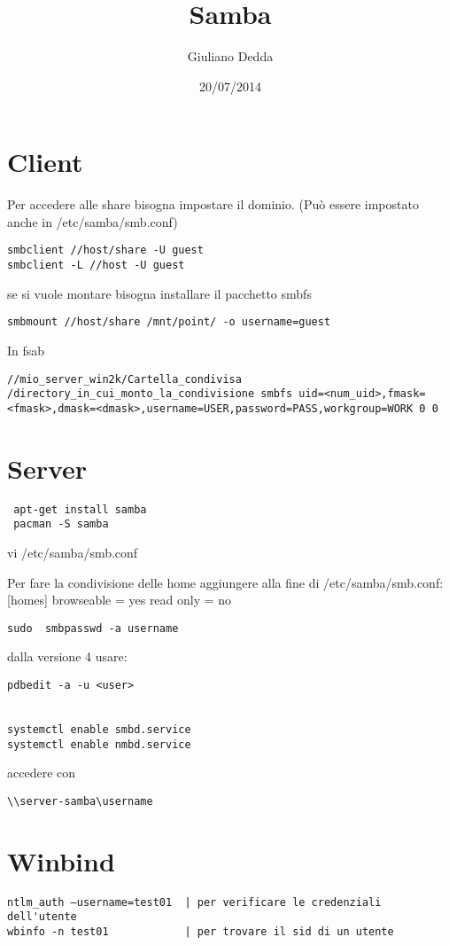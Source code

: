 \documentclass[]{article}
\title{Samba}
\author{Giuliano Dedda}
\date{20/07/2014}
\begin{document}
\maketitle

\section{Client}\label{client}

Per accedere alle share bisogna impostare il dominio. (Può essere
impostato anche in /etc/samba/smb.conf)

\begin{verbatim}
smbclient //host/share -U guest
smbclient -L //host -U guest
\end{verbatim}

se si vuole montare bisogna installare il pacchetto smbfs

\begin{verbatim}
smbmount //host/share /mnt/point/ -o username=guest
\end{verbatim}

In fsab

\begin{verbatim}
//mio_server_win2k/Cartella_condivisa
/directory_in_cui_monto_la_condivisione smbfs uid=<num_uid>,fmask=<fmask>,dmask=<dmask>,username=USER,password=PASS,workgroup=WORK 0 0
\end{verbatim}

\section{Server}\label{server}

\begin{verbatim}
 apt-get install samba 
 pacman -S samba
\end{verbatim}

vi /etc/samba/smb.conf

Per fare la condivisione delle home aggiungere alla fine di
/etc/samba/smb.conf: {[}homes{]} browseable = yes read only = no

\begin{verbatim}
sudo  smbpasswd -a username
\end{verbatim}

dalla versione 4 usare:

\begin{verbatim}
pdbedit -a -u <user>


systemctl enable smbd.service
systemctl enable nmbd.service
\end{verbatim}

accedere con

\begin{verbatim}
\\server-samba\username
\end{verbatim}

\section{Winbind}\label{winbind}

\begin{verbatim}
ntlm_auth –username=test01  | per verificare le credenziali dell'utente
wbinfo -n test01            | per trovare il sid di un utente
\end{verbatim}
\end{document}
